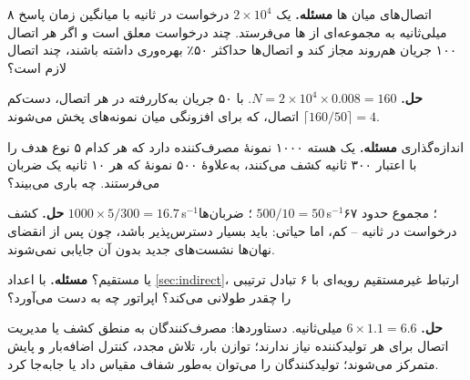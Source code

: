 \documentclass[11pt,a4paper]{article}
\begin{document}
\begin{examplebox}{اتصال‌های میان ها}\label{ex:inflight}
\textbf{مسئله.} یک  $2\times10^4$ درخواست در ثانیه با میانگین زمان پاسخ ۸ میلی‌ثانیه به مجموعه‌ای از ها
می‌فرستد. چند درخواست معلق است و اگر هر اتصال ۱۰۰ جریان هم‌روند مجاز کند و اتصال‌ها حداکثر ۵۰٪ بهره‌وری داشته باشند، چند
اتصال  لازم است؟

\textbf{حل.} $N = 2\times10^4\times0.008 = 160$. با ۵۰ جریان به‌کاررفته در هر اتصال، دست‌کم $\lceil160/50\rceil = 4$ اتصال، که برای
افزونگی میان نمونه‌های  پخش می‌شوند.
\end{examplebox}

\begin{examplebox}{اندازه‌گذاری }\label{ex:cache}
\textbf{مسئله.} یک هسته ۱۰۰۰ نمونهٔ مصرف‌کننده دارد که هر کدام ۵ نوع هدف را با اعتبار ۳۰۰ ثانیه کشف می‌کنند، به‌علاوهٔ ۵۰۰
نمونهٔ  که هر ۱۰ ثانیه یک ضربان می‌فرستند.  چه باری می‌بیند؟

\textbf{حل.} کشف $1000\times5/300 = 16.7$\,s$^{-1}$؛ ضربان‌ها $500/10 = 50$\,s$^{-1}$؛ مجموع حدود ۶۷ درخواست در ثانیه -- کم، اما
حیاتی:  باید بسیار دسترس‌پذیر باشد، چون پس از انقضای نهان‌ها نشست‌های جدید بدون آن جایابی نمی‌شوند.
\end{examplebox}

\begin{examplebox}{ یا مستقیم؟}\label{ex:scp}
\textbf{مسئله.} با اعداد \cref{sec:indirect}، ارتباط غیرمستقیم رویه‌ای با ۶ تبادل ترتیبی  را چقدر طولانی می‌کند؟ اپراتور
چه به دست می‌آورد؟

\textbf{حل.} $6\times1.1 = 6.6$ میلی‌ثانیه. دستاوردها: مصرف‌کنندگان به منطق کشف یا مدیریت اتصال برای هر تولیدکننده نیاز ندارند؛
توازن بار، تلاش مجدد، کنترل اضافه‌بار و پایش متمرکز می‌شوند؛ تولیدکنندگان را می‌توان به‌طور شفاف مقیاس داد یا جابه‌جا کرد.
\end{examplebox}

\end{document}
